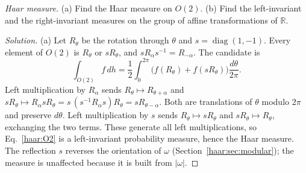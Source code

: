 \begin{exercise}
\emph{Haar measure.}
(a) Find the Haar measure on $O(2)$.
(b) Find the left-invariant and the right-invariant measures on the group of
affine transformations of $\mathbb R$.
\end{exercise}
\begin{proof}[Solution]
(a) Let $R_\theta$ be the rotation through $\theta$ and
$s=\operatorname{diag}(1,-1)$. Every element of $O(2)$ is $R_\theta$ or
$sR_\theta$, and $sR_\alpha s^{-1}=R_{-\alpha}$. The candidate is
\begin{equation}\label{haar:O2}
 \int_{O(2)}f\,dh=\frac12\int_0^{2\pi}\big(f(R_\theta)+f(sR_\theta)\big)
 \frac{d\theta}{2\pi}.
\end{equation}
Left multiplication by $R_\alpha$ sends $R_\theta\mapsto R_{\theta+\alpha}$
and $sR_\theta\mapsto R_\alpha sR_\theta=s\,(s^{-1}R_\alpha s)R_\theta
=sR_{\theta-\alpha}$. Both are translations of $\theta$ modulo $2\pi$ and
preserve $d\theta$. Left multiplication by $s$ sends $R_\theta\mapsto
sR_\theta$ and $sR_\theta\mapsto R_\theta$, exchanging the two terms. These
generate all left multiplications, so Eq.~\eqref{haar:O2} is a left-invariant
probability measure, hence the Haar measure. The reflection $s$ reverses the
orientation of $\omega$ (Section~\ref{haar:sec:modular}); the measure is
unaffected because it is built from $|\omega|$.


\end{proof}
